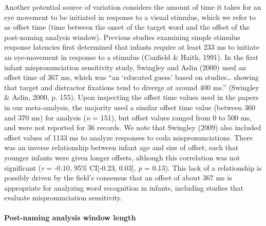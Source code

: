\documentclass[man]{apa6}
\let\oldparagraph\paragraph
\renewcommand{\paragraph}[1]{\oldparagraph{#1}\mbox{}}
\begin{document}
Another potential source of variation considers the amount of time it takes for an eye movement to be initiated in response to a visual stimulus, which we refer to as offset time (time between the onset of the target word and the offset of the post-naming analysis window). Previous studies examining simple stimulus response latencies first determined that infants require at least 233 ms to initiate an eye-movement in response to a stimulus (Canfield \& Haith, 1991). In the first infant mispronunciation sensitivity study, Swingley and Aslin (2000) used an offset time of 367 ms, which was \enquote{an \enquote{educated guess} based on studies\ldots{} showing that target and distractor fixations tend to diverge at around 400 ms.} (Swingley \& Aslin, 2000, p. 155). Upon inspecting the offset time values used in the papers in our meta-analysis, the majority used a similar offset time value (between 360 and 370 ms) for analysis (\emph{n} = 151), but offset values ranged from 0 to 500 ms, and were not reported for 36 records. We note that Swingley (2009) also included offset values of 1133 ms to analyze responses to coda mispronunciations. There was an inverse relationship between infant age and size of offset, such that younger infants were given longer offsets, although this correlation was not significant (\emph{r} = -0.10, 95\% CI{[}-0.23, 0.03{]}, \emph{p} = 0.13). This lack of a relationship is possibly driven by the field's consensus that an offset of about 367 ms is appropriate for analyzing word recognition in infants, including studies that evaluate mispronunciation sensitivity.

\hypertarget{post-naming-analysis-window-length}{%
\paragraph{Post-naming analysis window length}\label{post-naming-analysis-window-length}}
\end{document}
